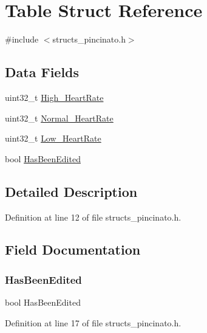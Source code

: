 \hypertarget{struct_table}{}\section{Table Struct Reference}
\label{struct_table}


{\ttfamily \#include $<$structs\+\_\+pincinato.\+h$>$}

\subsection*{Data Fields}
\begin{DoxyCompactItemize}
\item 
uint32\+\_\+t \mbox{\hyperlink{struct_table_a083b719ad6c79f4ae24629ff524568c5}{High\+\_\+\+Heart\+Rate}}
\item 
uint32\+\_\+t \mbox{\hyperlink{struct_table_a2639bf590ecf1e2847a7cc426eb9286b}{Normal\+\_\+\+Heart\+Rate}}
\item 
uint32\+\_\+t \mbox{\hyperlink{struct_table_abee6357a367856ae631545d1499ae7cd}{Low\+\_\+\+Heart\+Rate}}
\item 
bool \mbox{\hyperlink{struct_table_a29b7719b9fe37705659ac979eb31ab54}{Has\+Been\+Edited}}
\end{DoxyCompactItemize}


\subsection{Detailed Description}


Definition at line 12 of file structs\+\_\+pincinato.\+h.



\subsection{Field Documentation}
\mbox{\label{struct_table_a29b7719b9fe37705659ac979eb31ab54}} 
\subsubsection{\texorpdfstring{Has\+Been\+Edited}{HasBeenEdited}}
{\footnotesize\ttfamily bool Has\+Been\+Edited}



Definition at line 17 of file structs\+\_\+pincinato.\+h.


